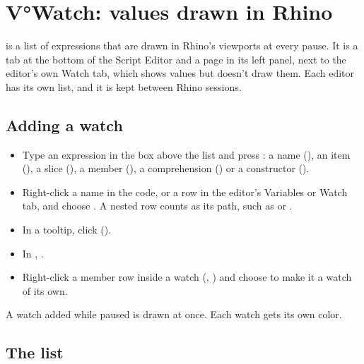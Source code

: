 \chapter{V°Watch: values drawn in Rhino}\label{ch:watch}

 is a list of expressions that are drawn in Rhino's viewports at every pause. It is a tab at
the bottom of the Script Editor and a page in its left panel, next to the editor's own Watch tab, which
shows values but doesn't draw them. Each editor has its own list, and it is kept between Rhino sessions.


\section{Adding a watch}\label{sec:addwatch}

\begin{itemize}
  \item Type an expression in the box above the list and press : a name (), an item
        (), a slice (), a member (), a comprehension
        () or a constructor ().
  \item Right-click a name in the code, or a row in the editor's Variables or Watch tab, and choose
        . A nested row counts as its path, such as  or .
  \item In a tooltip, click  ().
  \item In , .
  \item Right-click a member row inside a watch (, \code{[0]}) and choose  to
        make it a watch of its own.
\end{itemize}

A watch added while paused is drawn at once. Each watch gets its own color.

\section{The list}\label{sec:watchlist}

